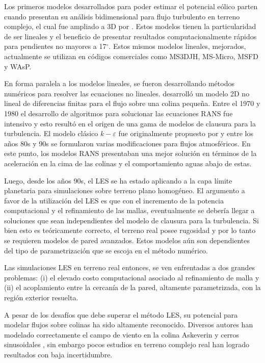Los primeros modelos desarrollados para poder estimar el potencial eólico parten cuando \cite{jackson1975turbulent} presentan su análisis bidimensional para flujo turbulento en terreno complejo, el cual fue ampliado a 3D por \cite{mason1979flow}. Estos modelos tienen la particularidad de ser lineales y el beneficio de presentar resultados computacionalmente rápidos para pendientes no mayores a 17$^\circ$. Estos mismos modelos lineales, mejorados, actualmente se utilizan en códigos comerciales como MS3DJH, MS-Micro, MSFD y WAsP.

En forma paralela a los modelos lineales, se fueron desarrollando métodos numéricos para resolver las ecuaciones no lineales. \cite{taylor1977some} desarrolló un modelo 2D no lineal de diferencias finitas para el flujo sobre una colina pequeña. Entre el 1970 y 1980 el desarrollo de algoritmos para solucionar las ecuaciones RANS fue intensivo y esto resultó en el origen de una gama de modelos de clausura para la turbulencia. El modelo clásico $k-\varepsilon$ fue originalmente propuesto por \cite{launder1974numerical} y entre los años 80s y 90s se formularon varias modificaciones para flujos atmosféricos. En este punto, los modelos RANS presentaban una mejor solución en términos de la aceleración en la cima de las colinas y el comportamiento aguas abajo de estas.

Luego, desde los años 90s, el LES se ha estado aplicando a la capa límite planetaria para simulaciones sobre terreno plano homogéneo. El argumento a favor de la utilización del LES es que con el incremento de la potencia computacional y el refinamiento de las mallas, eventualmente se debería llegar a soluciones que sean independientes del modelo de clausura para la turbulencia. Si bien esto es teóricamente correcto, el terreno real posee rugosidad y por lo tanto se requieren modelos de pared avanzados. Estos modelos aún son dependientes del tipo de parametrización que se escoja en el método numérico.

Las simulaciones LES en terreno real entonces, se ven enfrentadas a dos grandes problemas: (i) el elevado costo computacional asociado al refinamiento de malla y (ii) el acoplamiento entre la cercanía de la pared, altamente parametrizada, con la región exterior resuelta.

A pesar de los desafíos que debe superar el método LES, su potencial para modelar flujos sobre colinas ha sido altamente reconocido. Diversos autores han modelado correctamente el campo de viento en la colina Askeverin \citep{Chow2009,doi:10.1002/we.414} y cerros sinusoidales \citep{brown2001large,wan2007evaluation}, sin embargo pocos estudios en terreno complejo real han logrado resultados con baja incertidumbre.
